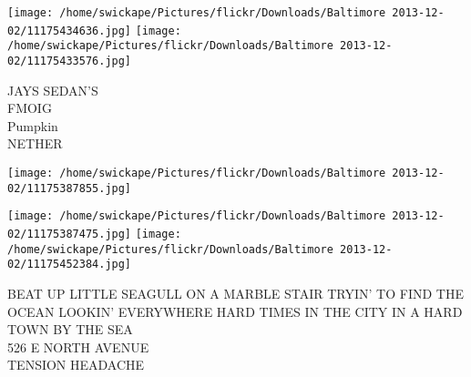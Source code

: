 \documentclass[10pt,letterpaper]{article}
\begin{document}
\texttt{[image: /home/swickape/Pictures/flickr/Downloads/Baltimore 2013-12-02/11175434636.jpg]}
\texttt{[image: /home/swickape/Pictures/flickr/Downloads/Baltimore 2013-12-02/11175433576.jpg]}

JAYS SEDAN'S\\
FMOIG\\
Pumpkin\\
NETHER
\pagebreak

\texttt{[image: /home/swickape/Pictures/flickr/Downloads/Baltimore 2013-12-02/11175387855.jpg]}

\vspace{0.25in}
\texttt{[image: /home/swickape/Pictures/flickr/Downloads/Baltimore 2013-12-02/11175387475.jpg]}
\texttt{[image: /home/swickape/Pictures/flickr/Downloads/Baltimore 2013-12-02/11175452384.jpg]}

BEAT UP LITTLE SEAGULL ON A MARBLE STAIR TRYIN' TO FIND THE OCEAN LOOKIN' EVERYWHERE HARD TIMES IN THE CITY IN A HARD TOWN BY THE SEA\\
526 E NORTH AVENUE\\
TENSION HEADACHE
\pagebreak
\end{document}
